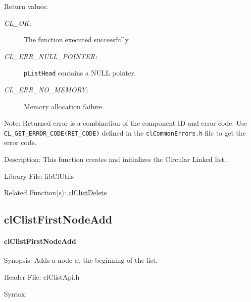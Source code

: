 \begin{flushleft}
\begin{Desc}
\item[Return values:]
\begin{description}
\item[{\em CL\_\-OK:}]The function executed successfully. 
\item[{\em CL\_\-ERR\_\-NULL\_\-POINTER:}]{\tt{pListHead}} contains a NULL pointer. 
\item[{\em CL\_\-ERR\_\-NO\_\-MEMORY:}]Memory allocation failure.\end{description}
\end{Desc}
\begin{Desc}
\item[Note:]Returned error is a combination of the component ID and error code. Use {\tt{CL\_\-GET\_\-ERROR\_\-CODE(RET\_\-CODE)}} defined in
the {\tt{clCommonErrors.h}} file to get the error code.\end{Desc}
\begin{Desc}
\item[Description:]This function creates and initializes the Circular Linked list.\end{Desc}
\begin{Desc}
\item[Library File:]lib\-Cl\-Utils\end{Desc}
\begin{Desc}
\item[Related Function(s):]\hyperlink{pagecl114}{cl\-Clist\-Delete} \end{Desc}
\newpage

\subsection{clClistFirstNodeAdd}
\hypertarget{pagecl102}{}\paragraph{cl\-Clist\-First\-Node\-Add}\label{pagecl102}
\begin{Desc}
\item[Synopsis:]Adds a node at the beginning of the list.\end{Desc}
\begin{Desc}
\item[Header File:]clClistApi.h\end{Desc}
\begin{Desc}
\item[Syntax:]


\end{Desc}
\end{flushleft}
